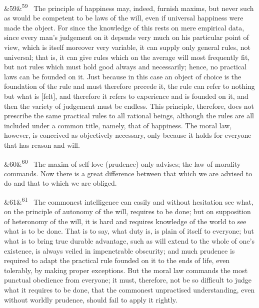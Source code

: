 \documentclass[12pt]{article}
\newcommand{\para}[1][]{\par\noindent\ifx&#1&\else\textsuperscript{\footnotesize #1}~\fi}
\begin{document}
\para[59] The principle of happiness may, indeed, furnish maxims, but never such as would be competent to be laws of the will, even if universal happiness were made the object. For since the knowledge of this rests on mere empirical data, since every man's judgement on it depends very much on his particular point of view, which is itself moreover very variable, it can supply only general rules, not universal; that is, it can give rules which on the average will most frequently fit, but not rules which must hold good always and necessarily; hence, no practical laws can be founded on it. Just because in this case an object of choice is the foundation of the rule and must therefore precede it, the rule can refer to nothing but what is [felt], and therefore it refers to experience and is founded on it, and then the variety of judgement must be endless. This principle, therefore, does not prescribe the same practical rules to all rational beings, although the rules are all included under a common title, namely, that of happiness. The moral law, however, is conceived as objectively necessary, only because it holds for everyone that has reason and will.

\para[60] The maxim of self-love (prudence) only advises; the law of morality commands. Now there is a great difference between that which we are advised to do and that to which we are obliged.

\para[61] The commonest intelligence can easily and without hesitation see what, on the principle of autonomy of the will, requires to be done; but on supposition of heteronomy of the will, it is hard and requires knowledge of the world to see what is to be done. That is to say, what duty is, is plain of itself to everyone; but what is to bring true durable advantage, such as will extend to the whole of one's existence, is always veiled in impenetrable obscurity; and much prudence is required to adapt the practical rule founded on it to the ends of life, even tolerably, by making proper exceptions. But the moral law commands the most punctual obedience from everyone; it must, therefore, not be so difficult to judge what it requires to be done, that the commonest unpractised understanding, even without worldly prudence, should fail to apply it rightly.
\end{document}
